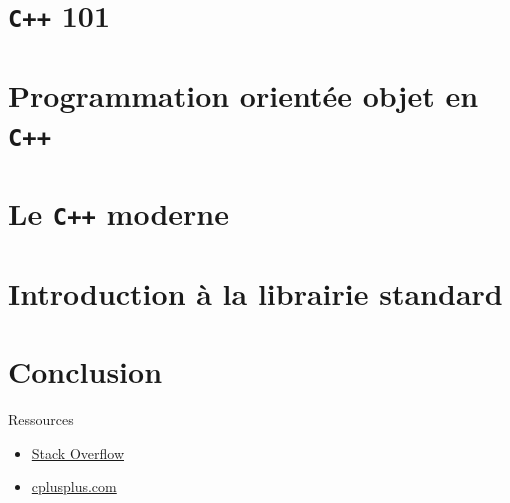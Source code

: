 \documentclass{beamer}
\numberwithin{equation}{section}
\begin{document}
\section{\texttt{C++} 101}
\label{sec:cpp101}



\section{Programmation orientée objet en \texttt{C++}}
\label{sec:poo}



\section{Le \texttt{C++} moderne}
\label{sec:cpp-moderne}



\section{Introduction à la librairie standard}


\section*{Conclusion}
\label{sec:conclusion}
\begin{frame}{Ressources}
  \begin{itemize}
    \item \href{https://stackoverflow.com/}{Stack Overflow}
    \item \href{http://www.cplusplus.com/}{cplusplus.com}
  \end{itemize}
\end{frame}
\end{document}
